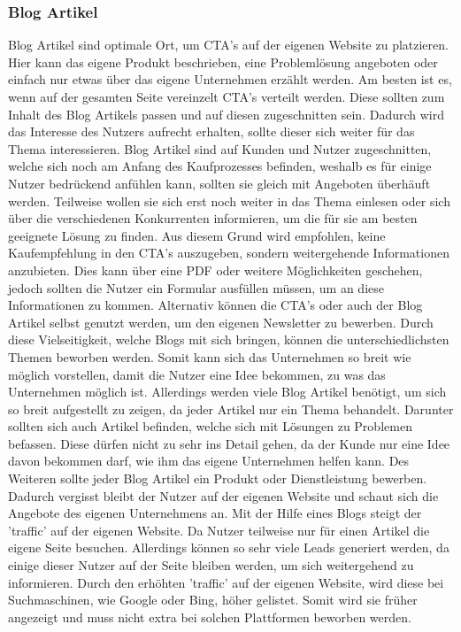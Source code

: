 \subsubsection{Blog Artikel}
Blog Artikel sind optimale Ort, um CTA's auf der eigenen Website zu platzieren. Hier kann das eigene Produkt beschrieben, eine Problemlösung angeboten oder einfach nur etwas über das eigene Unternehmen erzählt werden. Am besten ist es, wenn auf der gesamten Seite vereinzelt CTA's verteilt werden. Diese sollten zum Inhalt des Blog Artikels passen und auf diesen zugeschnitten sein. Dadurch wird das Interesse des Nutzers aufrecht erhalten, sollte dieser sich weiter für das Thema interessieren. 
\newline 
Blog Artikel sind auf Kunden und Nutzer zugeschnitten, welche sich noch am Anfang des Kaufprozesses befinden, weshalb es für einige Nutzer bedrückend anfühlen kann, sollten sie gleich mit Angeboten überhäuft werden. Teilweise wollen sie sich erst noch weiter in das Thema einlesen oder sich über die verschiedenen Konkurrenten informieren, um die für sie am besten geeignete Lösung zu finden. Aus diesem Grund wird empfohlen, keine Kaufempfehlung in den CTA's auszugeben, sondern weitergehende Informationen anzubieten. Dies kann über eine PDF oder weitere Möglichkeiten geschehen, jedoch sollten die Nutzer ein Formular ausfüllen müssen, um an diese Informationen zu kommen. Alternativ können die CTA's oder auch der Blog Artikel selbst genutzt werden, um den eigenen Newsletter zu bewerben. 
\newline
Durch diese Vielseitigkeit, welche Blogs mit sich bringen, können die unterschiedlichsten Themen beworben werden. Somit kann sich das Unternehmen so breit wie möglich vorstellen, damit die Nutzer eine Idee bekommen, zu was das Unternehmen möglich ist. Allerdings werden viele Blog Artikel benötigt, um sich so breit aufgestellt zu zeigen, da jeder Artikel nur ein Thema behandelt. Darunter sollten sich auch Artikel befinden, welche sich mit Lösungen zu Problemen befassen. Diese dürfen nicht zu sehr ins Detail gehen, da der Kunde nur eine Idee davon bekommen darf, wie ihm das eigene Unternehmen helfen kann. 
\newline
Des Weiteren sollte jeder Blog Artikel ein Produkt oder Dienstleistung bewerben. Dadurch vergisst bleibt der Nutzer auf der eigenen Website und schaut sich die Angebote des eigenen Unternehmens an. 
\newline 
Mit der Hilfe eines Blogs steigt der 'traffic' auf der eigenen Website. Da Nutzer teilweise nur für einen Artikel die eigene Seite besuchen. Allerdings können so sehr viele Leads generiert werden, da einige dieser Nutzer auf der Seite bleiben werden, um sich weitergehend zu informieren. Durch den erhöhten 'traffic' auf der eigenen Website, wird diese bei Suchmaschinen, wie Google oder Bing, höher gelistet. Somit wird sie früher angezeigt und muss nicht extra bei solchen Plattformen beworben werden. 
